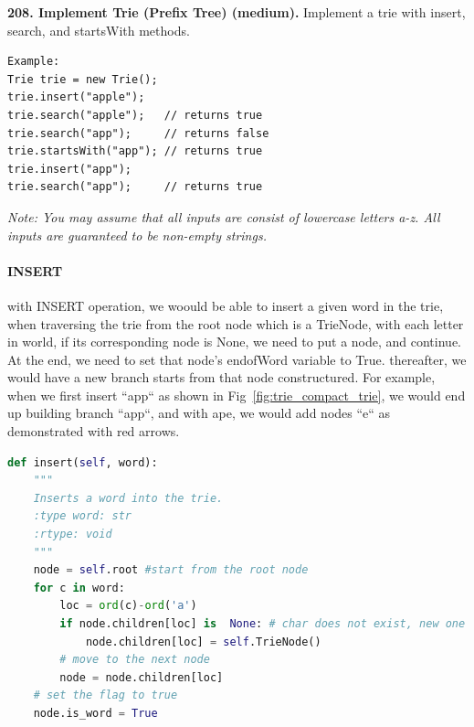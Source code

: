 \documentclass[data-structure.tex]{subfiles}
\begin{document}
\begin{examples}
\item \textbf{208. Implement Trie (Prefix Tree) (medium).} Implement a trie with insert, search, and startsWith methods.
\begin{lstlisting}
Example:
Trie trie = new Trie();
trie.insert("apple");
trie.search("apple");   // returns true
trie.search("app");     // returns false
trie.startsWith("app"); // returns true
trie.insert("app");   
trie.search("app");     // returns true
\end{lstlisting}
\textit{Note: You may assume that all inputs are consist of lowercase letters a-z. All inputs are guaranteed to be non-empty strings.}

\paragraph{INSERT} with INSERT operation, we woould be able to insert a given word in the trie, when traversing the trie from the root node which is a TrieNode, with each letter in world, if its corresponding node is None, we need to put a node, and continue. At the end, we need to set that node's endofWord variable to True. thereafter, we would have a new branch starts from that node constructured. For example, when we first insert ``app`` as shown in Fig~\ref{fig:trie_compact_trie}, we would end up building branch ``app``, and with ape, we would add nodes ``e`` as demonstrated with red arrows. 
\begin{lstlisting}[language=Python]
def insert(self, word):
    """
    Inserts a word into the trie.
    :type word: str
    :rtype: void
    """
    node = self.root #start from the root node
    for c in word:
        loc = ord(c)-ord('a')
        if node.children[loc] is  None: # char does not exist, new one
            node.children[loc] = self.TrieNode()
        # move to the next node
        node = node.children[loc]
    # set the flag to true
    node.is_word = True 
\end{lstlisting}


\end{examples}
\end{document}
